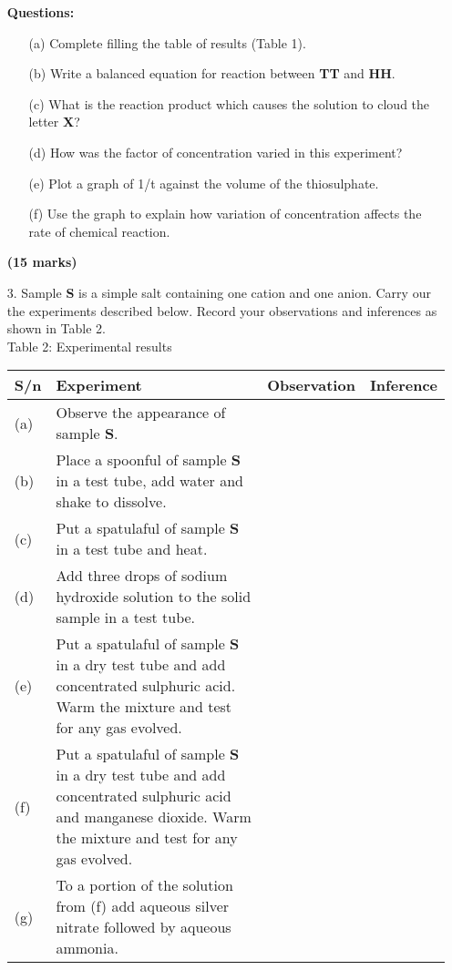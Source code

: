 \begin{enumerate}
\newpage

\textbf{Questions:}\\
\begin{enumerate}
\item[(a)] Complete filling the table of results (Table 1).
\item[(b)] Write a balanced equation for reaction between \textbf{TT} and \textbf{HH}.
\item[(c)] What is the reaction product which causes the solution to cloud the letter \textbf{X}?
\item[(d)] How was the factor of concentration varied in this experiment?
\item[(e)] Plot a graph of 1/t against the volume of the thiosulphate.
\item[(f)] Use the graph to explain how variation of concentration affects the rate of chemical reaction.\\
\end{enumerate}

\raggedleft \textbf{(15 marks)}

\raggedright


\item[3.] Sample \textbf{S} is a simple salt containing one cation and one anion. Carry our the experiments described below. Record your observations and inferences as shown in Table 2.\\

Table 2: Experimental results\\

\begin{center}
\begin{tabular}{|l|p{8cm}|l|l|}
\hline
\textbf{S/n}&\textbf{Experiment}&\textbf{Observation}&\textbf{Inference}\\ \hline
(a)&Observe the appearance of sample \textbf{S}.&&\\ \hline
(b)&Place a spoonful of sample \textbf{S} in a test tube, add water and shake to dissolve.&&\\ \hline
(c)&Put a spatulaful of sample \textbf{S} in a test tube and heat.&&\\ \hline
(d)&Add three drops of sodium hydroxide solution to the solid sample in a test tube.&&\\ \hline
(e)&Put a spatulaful of sample \textbf{S} in a dry test tube and add concentrated sulphuric acid. Warm the mixture and test for any gas evolved.&&\\ \hline
(f)&Put a spatulaful of sample \textbf{S} in a dry test tube and add concentrated sulphuric acid and manganese dioxide. Warm the mixture and test for any gas evolved.&&\\ \hline
(g)&To a portion of the solution from (f) add aqueous silver nitrate followed by aqueous ammonia.&&\\ \hline
\end{tabular}\\
\end{center}


\end{enumerate}
